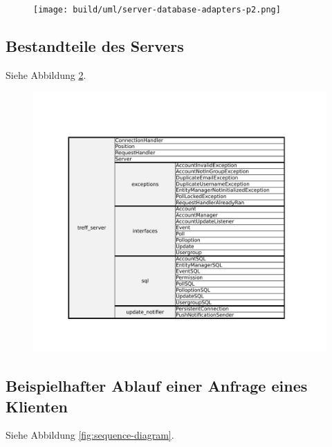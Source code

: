 \documentclass[parskip=full,11pt]{scrartcl}
\begin{document}
\begin{figure}[!htb]
    \centering
    \texttt{[image: build/uml/server-database-adapters-p2.png]}
	\label{fig:server-db-adapter1}
\end{figure}

\subsection{Bestandteile des Servers}
Siehe Abbildung \ref{fig:classesserver}.

\begin{figure}[!htb]
	\centering
	\includegraphics[width = \columnwidth / 1 * 1]{treff3.pdf}
	\label{fig:classesserver}
\end{figure}


\subsection{Beispielhafter Ablauf einer Anfrage eines Klienten}
Siehe Abbildung \ref{fig:sequence-diagram}.
\end{document}
